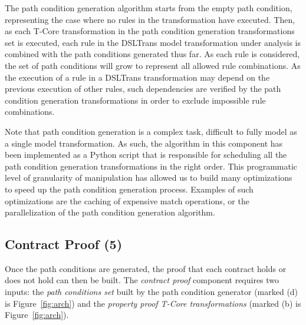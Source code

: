 The path condition generation algorithm starts from the empty path condition,
representing the case where no rules in the transformation have executed. Then,
as each T-Core transformation in the path condition generation
transformations set is executed, each rule in the
DSLTrans model transformation under analysis is combined with the path
conditions generated thus far. As each rule is considered, the set of path
conditions will grow to represent all allowed rule combinations.
As the execution of a rule in a DSLTrans transformation may depend on the
previous execution of other rules, such dependencies are verified by the path
condition generation transformations in order to exclude impossible rule
combinations.


Note that path condition generation is a complex task, difficult to fully model
as a single model transformation.
As such, the algorithm in this component has been implemented as a Python script
that is responsible for scheduling all the path condition generation
transformations in the right order.
This programmatic level of granularity of manipulation has allowed us to build
many optimizations to speed up the path condition generation process. Examples
of such optimizations are the caching of expensive match operations, or the
parallelization of the path condition generation algorithm.
 
\subsection{Contract Proof (5)}

Once the path conditions are generated, the proof that each contract holds or
does not hold can then be built. The \emph{contract proof} component requires
two inputs: the \emph{path conditions set} built by the path condition generator
(marked (d) is Figure~\ref{fig:arch}) and the \emph{property proof T-Core
transformations} (marked (b) is Figure~\ref{fig:arch}).


